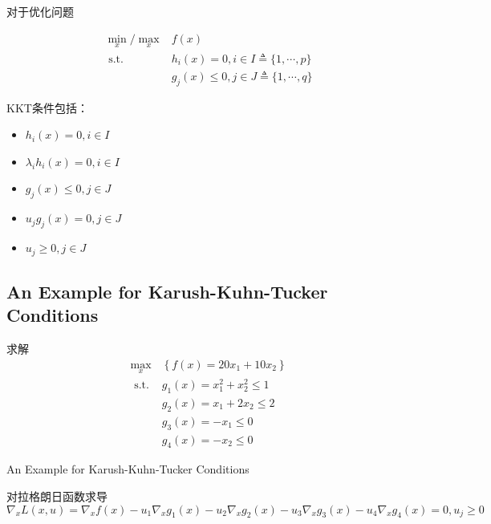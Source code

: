 \begin{theorem} 
    对于优化问题

    $$\begin{aligned}
        \min _{x} / \max_x &f(x) \\
\text{ s.t. } & h_{i}(x)=0, i \in I \triangleq\{1, \cdots, p\} \\
&g_{j}(x) \leq 0, j \in J \triangleq\{1, \cdots, q\}
    \end{aligned}$$
    
    KKT条件包括：
\begin{itemize}
    \item $ h_{i}(x)=0, i \in I $
    \item $ \lambda_{i} h_{i}(x)=0, i \in I $
    \item $ g_{j}(x) \leq 0, j \in J $
    \item $ u_{j} g_{j}(x)=0, j \in J $
    \item $ u_{j} \geq 0, j \in J $
\end{itemize}
\end{theorem}


\subsection{An Example for Karush-Kuhn-Tucker Conditions}
   
\begin{problem}
    求解
$$
\begin{aligned}
    \max _{x}&\left\{f(x)=20 x_{1}+10 x_{2}\right\} \\
  \text{ s.t. }  &   g_{1}(x)=x_{1}^{2}+x_{2}^{2} \leq 1 \\
  & g_{2}(x)=x_{1}+2 x_{2} \leq 2 \\
  &  g_{3}(x)=-x_{1} \leq 0 \\
    & g_{4}(x)=-x_{2} \leq 0 
\end{aligned}
$$
\end{problem}

\begin{FigureCenter}{An Example for Karush-Kuhn-Tucker Conditions}
    
\end{FigureCenter}


对拉格朗日函数求导
$$ \nabla_{x} L(x, u)=\nabla_{x} f(x)-u_{1} \nabla_{x} g_{1}(x)-u_{2} \nabla_{x} g_{2}(x)-u_{3} \nabla_{x} g_{3}(x)-u_{4} \nabla_{x} g_{4}(x)=0, u_{j} \geq 0 $$

